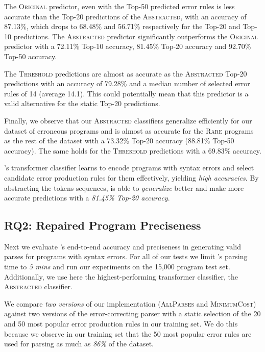 The \textsc{Original} predictor, even with the Top-50 predicted error rules is
less accurate than the Top-20 predictions of the \textsc{Abstracted}, with an
accuracy of 87.13\%, which drops to 68.48\% and 56.71\% respectively for the
Top-20 and Top-10 predictions. The \textsc{Abstracted} predictor significantly
outperforms the \textsc{Original} predictor with a 72.11\% Top-10 accuracy,
81.45\% Top-20 accuracy and 92.70\% Top-50 accuracy.

The \textsc{Threshold} predictions are almost as accurate as the
\textsc{Abstracted} Top-20 predictions with an accuracy of 79.28\% and a median
number of selected error rules of 14 (average 14.1). This could potentially mean
that this predictor is a valid alternative for the static Top-20 predictions.

Finally, we observe that our \textsc{Abstracted} classifiers generalize
efficiently for our dataset of erroneous \python programs and is almost as
accurate for the \textsc{Rare} programs as the rest of the dataset with a
73.32\% Top-20 accuracy (88.81\% Top-50 accuracy). The same holds for the
\textsc{Threshold} predictions with a 69.83\% accuracy.

\begin{framed}
  \noindent \toolname's transformer classifier learns to encode programs with
  syntax errors and select candidate error production rules for them
  effectively, yielding \emph{high accuracies}. By abstracting the tokens
  sequences, \toolname is able to \emph{generalize} better and make more
  accurate predictions with a \emph{81.45\% Top-20 accuracy}.
\end{framed}


\subsection{RQ2: Repaired Program Preciseness}
\label{sec:eval:precise}

Next we evaluate \toolname's end-to-end accuracy and preciseness in generating
valid parses for programs with syntax errors. For all of our tests we limit
\toolname's parsing time to \emph{5 mins} and run our experiments on the 15,000
program  test set. Additionally, we use here the highest-performing transformer
classifier, the \textsc{Abstracted} classifier.

We compare \emph{two versions} of our \toolname implementation
(\textsc{AllParses} and \textsc{MinimumCost}) against two versions of the
error-correcting parser with a static selection of the 20 and 50 most popular
error production rules in our training set. We do this because we
observe in our training set that the 50 most popular error rules are used for
parsing as much as \emph{86\%} of the dataset.

